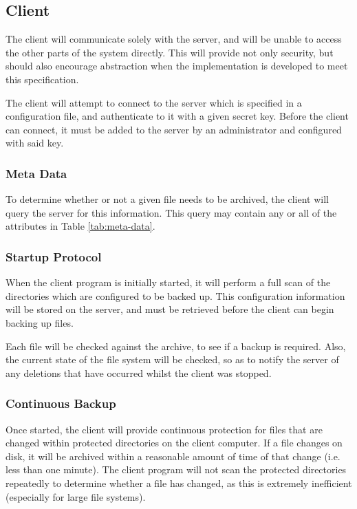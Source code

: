 \subsection{Client}

The client will communicate solely with the server, and will be unable to
access the other parts of the system directly. This will provide not only
security, but should also encourage abstraction when the implementation is
developed to meet this specification.

The client will attempt to connect to the server which is specified in
a configuration file, and authenticate to it with a given secret key. Before
the client can connect, it must be added to the server by an administrator and
configured with said key.

\subsubsection{Meta Data}

To determine whether or not a given file needs to be archived, the client will
query the server for this information. This query may contain any or all of the
attributes in Table \ref{tab:meta-data}.

\subsubsection{Startup Protocol}

When the client program is initially started, it will perform a full scan of
the directories which are configured to be backed up. This configuration
information will be stored on the server, and must be retrieved before the
client can begin backing up files.

Each file will be checked against the archive, to see if a backup is required.
Also, the current state of the file system will be checked, so as to notify the
server of any deletions that have occurred whilst the client was stopped.

\subsubsection{Continuous Backup}

Once started, the client will provide continuous protection for files that are
changed within protected directories on the client computer. If a file changes
on disk, it will be archived within a reasonable amount of time of that change
(i.e. less than one minute). The client program will not scan the protected
directories repeatedly to determine whether a file has changed, as this is
extremely inefficient (especially for large file systems).

